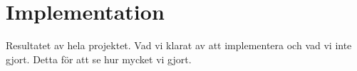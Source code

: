\section{Implementation}

Resultatet av hela projektet. Vad vi klarat av att implementera och vad vi inte gjort. Detta för att se hur mycket vi gjort. 